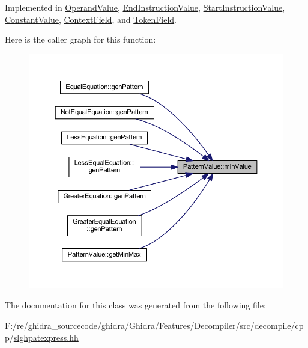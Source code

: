 Implemented in \mbox{\hyperlink{class_operand_value_a5be26ae272c87ca0e0bbbc52c627c62a}{Operand\+Value}}, \mbox{\hyperlink{class_end_instruction_value_a24592780f2f2f6e5baa22337d621c0e9}{End\+Instruction\+Value}}, \mbox{\hyperlink{class_start_instruction_value_a3bb03f2948fdb225bbd97607915829bd}{Start\+Instruction\+Value}}, \mbox{\hyperlink{class_constant_value_a559890921d7f3d3b4c1f84b38c5cb751}{Constant\+Value}}, \mbox{\hyperlink{class_context_field_a53a80959fd559909162619b5f899bb2e}{Context\+Field}}, and \mbox{\hyperlink{class_token_field_a9b632778768fcc9d396ef12890ada93b}{Token\+Field}}.

Here is the caller graph for this function\+:
\nopagebreak
\begin{figure}[H]
\begin{center}
\leavevmode
\includegraphics[width=350pt]{class_pattern_value_a0dbf85240fe6310e36596fea3bb02f2e_icgraph}
\end{center}
\end{figure}


The documentation for this class was generated from the following file\+:\begin{DoxyCompactItemize}
\item 
F\+:/re/ghidra\+\_\+sourcecode/ghidra/\+Ghidra/\+Features/\+Decompiler/src/decompile/cpp/\mbox{\hyperlink{slghpatexpress_8hh}{slghpatexpress.\+hh}}\end{DoxyCompactItemize}
